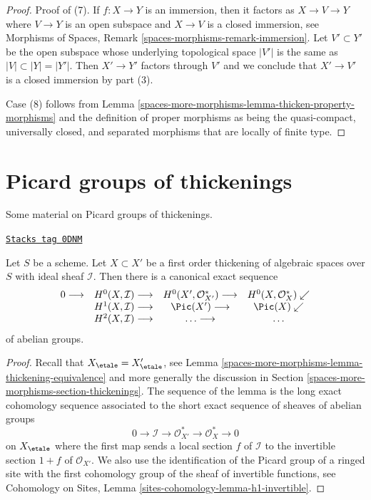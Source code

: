 \begin{proof}
\medskip\noindent
Proof of (7). If $f : X \to Y$ is an immersion, then it factors as
$X \to V \to Y$ where $V \to Y$ is an open subspace and $X \to V$ is a
closed immersion, see
Morphisms of Spaces, Remark \ref{spaces-morphisms-remark-immersion}.
Let $V' \subset Y'$ be the open subspace whose
underlying topological space $|V'|$ is the same as $|V| \subset |Y| = |Y'|$.
Then $X' \to Y'$ factors through $V'$ and we conclude that $X' \to V'$
is a closed immersion by part (3).

\medskip\noindent
Case (8) follows from Lemma \ref{spaces-more-morphisms-lemma-thicken-property-morphisms}
and the definition of proper morphisms as being the quasi-compact,
universally closed, and separated morphisms that are locally of finite type.
\end{proof}

\section{Picard groups of thickenings}
\label{spaces-more-morphisms-section-picard-group-thickening}
Some material on Picard groups of thickenings.

\begin{lemma}
\label{spaces-more-morphisms-lemma-picard-group-first-order-thickening}
\href{https://stacks.math.columbia.edu/tag/0DNM}{\texttt{Stacks tag 0DNM}}

Let $S$ be a scheme. Let $X \subset X'$ be a first order thickening
of algebraic spaces over $S$ with ideal sheaf $\mathcal{I}$.
Then there is a canonical exact sequence
$$
\begin{array}{cccc}0 \longrightarrow & H^0(X, \mathcal{I}) \longrightarrow & H^0(X', \mathcal{O}_{X'}^*) \longrightarrow & H^0(X, \mathcal{O}^*_X) \swarrow \\  & H^1(X, \mathcal{I}) \longrightarrow & \Pic(X') \longrightarrow & \Pic(X) \swarrow \\  & H^2(X, \mathcal{I}) \longrightarrow & \ldots \longrightarrow & \ldots\end{array}
$$
of abelian groups.
\end{lemma}

\begin{proof}
Recall that $X_\etale = X'_\etale$, see
Lemma \ref{spaces-more-morphisms-lemma-thickening-equivalence} and more generally the
discussion in Section \ref{spaces-more-morphisms-section-thickenings}.
The sequence of the lemma is the long exact cohomology sequence
associated to the short exact sequence of sheaves of abelian groups
$$
0 \to \mathcal{I} \to \mathcal{O}_{X'}^* \to \mathcal{O}_X^* \to 0
$$
on $X_\etale$ where the first map sends a local section $f$ of $\mathcal{I}$
to the invertible section $1 + f$ of $\mathcal{O}_{X'}$.
We also use the identification of the Picard group of a
ringed site with the first cohomology group of the sheaf
of invertible functions, see
Cohomology on Sites, Lemma \ref{sites-cohomology-lemma-h1-invertible}.
\end{proof}

